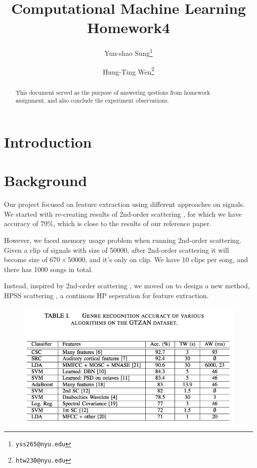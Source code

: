 \documentclass[final]{siamltexmm}
\title{Computational Machine Learning Homework4}
\author{Yun-shao Sung\thanks{\tt yss265@nyu.edu}
        \and Hung-Ting Wen\thanks{\tt htw230@nyu.edu}}
\begin{document}
\maketitle

\begin{abstract}
This document served as the purpose of answering qestions from homework assignment, and also conclude the experiment observations.
\end{abstract}

\pagestyle{myheadings}
\thispagestyle{plain}


\section{Introduction}

\section{Background}
Our project focused on feature extraction using different approaches on signals.  We started with re-creating results of 2nd-order scattering \cite{mgc} , for which we have accuracy of 79\%, which is close to the results of our reference paper. %

However, we faced memory usage problem when running 2nd-order scattering.  Given a clip of signals with size of 50000, after 2nd-order scattering it will become size of $670 \times 50000$, and it's only on clip.  We have 10 clips per song, and there has 1000 songs in total.

Instead, inspired by 2nd-order scattering \cite{mgc} , we moved on to design a new method, HPSS scattering , a continous HP seperation for feature extraction.  %

\begin{figure}[ht]
  \begin{center}
    \includegraphics[scale=0.7]{../fig/refAccr.png}
  \end{center}
\end{figure}
\end{document}
